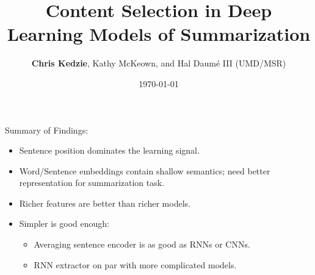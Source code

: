 \documentclass{beamer}
\title[Content in DL Sum.]{Content Selection in Deep Learning Models of Summarization} %
\author[Chris Kedzie]{\textbf{Chris Kedzie}, Kathy McKeown, and Hal Daum\'e III (UMD/MSR)} %
\institute[Columbia U.] %
{
Columbia University \\ %
\medskip
\textit{kedzie@cs.columbia.edu} %
}
\date{\today} %
\begin{document}
\begin{frame}
\titlepage 
\end{frame}









\begin{frame}

    Summary of Findings:
    \begin{itemize}
        \item<1-> Sentence position dominates the learning signal. 
        \item<2-> Word/Sentence embeddings contain shallow semantics; need better representation for summarization task.
        \item<4-> Richer features are better than richer models.
        \item<5-> Simpler is good enough:
            \begin{itemize}
        \item<6-> Averaging sentence encoder is as good as RNNs or CNNs.
        \item<7-> RNN extractor on par with more complicated models.
    \end{itemize}
    \end{itemize}



\end{frame}
\end{document}
